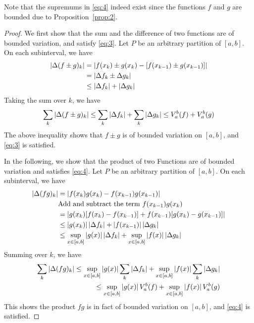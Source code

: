 \documentclass[thmcnt=section, color=blue, 12pt]{my-elegantbook}
\begin{document}
\begin{note}
	Note that the supremums in \eqref{eq:4} indeed exist
	since the functions $f$ and $g$ are bounded due to Proposition~\ref{prop:2}.
\end{note}

\begin{proof}
	We first show that the sum and the difference of two functions
	are of bounded variation, and satisfy \eqref{eq:3}.
	Let $P$ be an arbitrary partition of $[a, b]$.
	On each subinterval, we have
	\begin{align*}
		\left\lvert \Delta (f \pm g)_k \right\rvert
		 & = \left\lvert f(x_{k}) \pm g(x_{k}) - [f(x_{k-1}) \pm g(x_{k-1})] \right\rvert \\
		 & = \left\lvert \Delta f_k \pm \Delta g_k \right\rvert                           \\
		 & \leq \left\lvert \Delta f_k \right\rvert + \left\lvert \Delta g_k \right\rvert
	\end{align*}
	Taking the sum over $k$, we have
	\begin{align*}
		\sum_{k} \left\lvert \Delta (f \pm g)_k \right\rvert
		\leq \sum_{k} \left\lvert \Delta f_k \right\rvert + \sum_k \left\lvert \Delta g_k \right\rvert
		\leq V_a^b (f) + V_a^b (g)
	\end{align*}
	The above inequality shows that $f \pm g$ is of bounded variation on $[a, b]$,
	and \eqref{eq:3} is satisfied.

	In the following, we show that the product of two Functions
	are of bounded variation and satisfies \eqref{eq:4}.
	Let $P$ be an arbitrary partition of $[a, b]$.
	On each subinterval, we have
	\begin{align*}
		\left\lvert \Delta (fg)_k \right\rvert
		 & = \left\lvert f(x_{k}) g(x_{k}) - f(x_{k-1}) g(x_{k-1}) \right\rvert                                \\
		 & \text{Add and subtract the term $f(x_{k-1})g(x_{k})$}                            \\
		 & = \left\lvert  g(x_{k})[ f(x_{k}) - f(x_{k-1})] + f(x_{k-1})[ g(x_{k}) - g(x_{k-1}) ]  \right\rvert \\
		 & \leq \left\lvert g(x_{k}) \right\rvert \left\lvert \Delta f_k \right\rvert + \left\lvert f(x_{k-1}) \right\rvert \left\lvert  \Delta g_k  \right\rvert       \\
		 & \leq \sup_{x \in [a, b]} \left\lvert g(x) \right\rvert \left\lvert \Delta f_k \right\rvert
		+ \sup_{x \in [a, b]} \left\lvert f(x) \right\rvert \left\lvert \Delta g_k \right\rvert
	\end{align*}
	Summing over $k$, we have
	\begin{align*}
		\sum_k \left\lvert \Delta (fg)_k \right\rvert
		\leq \sup_{x \in [a, b]} \left\lvert g(x) \right\rvert \sum_k \left\lvert \Delta f_k \right\rvert
		+ \sup_{x \in [a, b]} \left\lvert f(x) \right\rvert \sum_k \left\lvert \Delta g_k \right\rvert \\
		\leq  \sup_{x \in [a, b]} \left\lvert g(x) \right\rvert V_a^b (f)
		+ \sup_{x \in [a, b]} \left\lvert f(x) \right\rvert V_a^b (g)
	\end{align*}
	This shows the product $fg$ is in fact of bounded variation on $[a, b]$,
	and \eqref{eq:4} is satisfied.
\end{proof}
\end{document}
